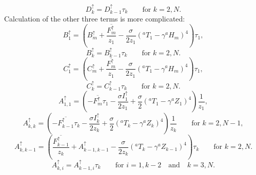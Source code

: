 \documentclass[11pt, a4paper,twoside]{article}
\newcommand{\HH}[2]{{{}^{#1}H_{#2}}}
\newcommand{\Z}[2]{{{}^{#1}Z_{#2}}}
\newcommand{\T}[2]{{{}^{#1}T_{#2}}}
\newcommand{\aup}[1]{A^{\uparrow}_{#1}}
\newcommand{\bup}[1]{B^{\uparrow}_{#1}}
\newcommand{\cupp}[1]{C^{\uparrow}_{#1}}
\newcommand{\dup}[1]{D^{\uparrow}_{#1}}
\newcommand{\iup}[1]{I^{\uparrow}_{#1}}
\newcommand{\Fup}[1]{{F^{\uparrow}_{#1}}}
\numberwithin{equation}{section}
\begin{document}
\begin{description}
\begin{equation}
\end{equation}
\begin{equation}
\dup{k} = \dup{k-1} \tau_k \quad \quad \textrm{for }k=2,N.
\end{equation}
Calculation of the other three terms is more complicated:
\begin{equation}
\bup{1} =  \left(\bup{m} + \frac{ \overline{ \Fup{m} } }{ z_1 } - \frac{ \sigma }{ 2 z_1} ( \T{a}{1} - \gamma \HH{a}{m} )^4 \right) \tau_1,
\end{equation}
\begin{equation}
\bup{k} =  \bup{k-1} \tau_k \quad \quad \textrm{for }k=2,N.
\end{equation}
\begin{equation}
\cupp{1} =  \left(\cupp{m} + \frac{ \overline{ \Fup{m} } }{ z_1 } - \frac{ \sigma }{ 2 z_1} ( \T{a}{1} - \gamma \HH{a}{m} )^4 \right) \tau_1,
\end{equation}
\begin{equation}
\cupp{k} =  \cupp{k-1} \tau_k \quad \quad \textrm{for }k=2,N.
\end{equation}
\begin{equation}
\aup{1,1} = \left( - \overline{\Fup{m}} \tau_1 - \frac{\sigma \iup{1}}{2 z_1}+  \frac{\sigma}{2}(\T{a}{1} - \gamma \Z{a}{1})^4\right) \frac{1}{z_1},
\end{equation}
\begin{equation}
\aup{k,k} = \left(  - \overline{\Fup{k-1}} \tau_k - \frac{\sigma \iup{k}}{2 z_k}+  \frac{\sigma}{2}(\T{a}{k} - \gamma \Z{a}{k})^4\right) \frac{1}{z_k} \quad \quad \textrm{for }k = 2,N-1,
\end{equation}
\begin{equation}
\aup{k,k-1} = \left(\frac{\overline{\Fup{k-1}}}{z_k} + \aup{k-1,k-1} - \frac{\sigma}{2z_k}(\T{a}{k} - \gamma \Z{a}{k-1})^4\right)\tau_k \quad \quad \textrm{for }k = 2,N.
\end{equation}
\begin{equation}
\aup{k,i} = \aup{k-1,i}\tau_k \quad \quad \textrm{for }i =1, k-2 \quad \textrm{and} \quad k=3,N.
\end{equation}


\end{description}
\end{document}
